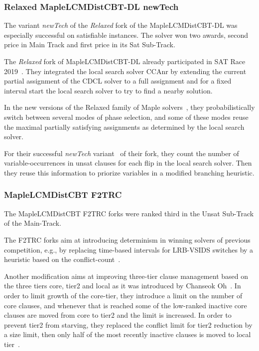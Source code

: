\documentclass{elsarticle}
\begin{document}
\subsubsection{Relaxed MapleLCMDistCBT-DL newTech}

The variant \emph{newTech} of the \emph{Relaxed} fork of the MapleLCMDistCBT-DL was especially successful on satisfiable instances. 
The solver won two awards, second price in Main Track and first price in its Sat Sub-Track.

The \emph{Relaxed} fork of MapleLCMDistCBT-DL already participated in SAT Race 2019~\cite{Xindi:SC2019}.
They integrated the local search solver CCAnr by extending the current partial assignment of the CDCL solver to a full assignment and for a fixed interval start the local search solver to try to find a nearby solution. 

In the new versions of the Relaxed family of Maple solvers~\cite{Xindi:SC2020}, they probabilistically switch between several modes of phase selection, and some of these modes reuse the maximal partially satisfying assignments as determined by the local search solver.

For their successful \emph{newTech} variant~\cite{Xindi:SC2020} of their fork, they count the number of variable-occurrences in unsat clauses for each flip in the local search solver. 
Then they reuse this information to priorize variables in a modified branching heuristic. 


\subsubsection{MapleLCMDistCBT F2TRC}

The MapleLCMDistCBT F2TRC forks were ranked third in the Unsat Sub-Track of the Main-Track.

The F2TRC forks aim at introducing determinism in winning solvers of previous competition, e.g., by replacing time-based intervals for LRB-VSIDS switches by a heuristic based on the conflict-count~\cite{Kochemazov:SC2020}. 

Another modification aims at improving three-tier clause management based on the three tiers core, tier2 and local as it was introduced by Chanseok Oh~\cite{Oh:2015:satunsat}.
In order to limit growth of the core-tier, they introduce a limit on the number of core clauses, and whenever that is reached some of the low-ranked inactive core clauses are moved from core to tier2 and the limit is increased. 
In order to prevent tier2 from starving, they replaced the conflict limit for tier2 reduction by a size limit, then only half of the most recently inactive clauses is moved to local tier~\cite{Kochemazov:SC2020}. 
\end{document}
